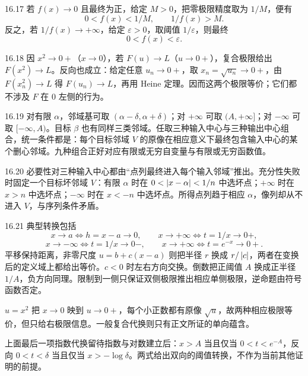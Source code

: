 \begin{solution}{16.17}
若 \(f(x)\to0\) 且最终为正，给定 \(M>0\)，把零极限精度取为 \(1/M\)，便有
\[
 0<f(x)<1/M,\qquad1/f(x)>M.
\]
反之，若 \(1/f(x)\to+\infty\)，给定 \(\varepsilon>0\)，取阈值 \(1/\varepsilon\)，则最终
\[
 0<f(x)<\varepsilon.
\]
\end{solution}

\begin{solution}{16.18}
因 \(x^2\to0+\)（\(x\to0\)），若 \(F(u)\to L\)（\(u\to0+\)），复合极限给出 \(F(x^2)\to L\)。反向也成立：给定任意 \(u_n\to0+\)，取 \(x_n=\sqrt{u_n}\to0+\)，由 \(F(x_n^2)\to L\) 得 \(F(u_n)\to L\)，再用 Heine 定理。因而这两个极限等价；它们都不涉及 \(F\) 在 \(0\) 左侧的行为。
\end{solution}

\begin{solution}{16.19}
对有限 \(\alpha\)，邻域基可取 \((\alpha-\delta,\alpha+\delta)\)；对 \(+\infty\) 可取 \((A,+\infty]\)；对 \(-\infty\) 可取 \([-\infty,A)\)。目标 \(\beta\) 也有同样三类邻域。任取三种输入中心与三种输出中心组合，统一条件都是：每个目标邻域 \(V\) 的原像在相应意义下最终包含输入中心的某个删心邻域。九种组合正好对应有限或无穷自变量与有限或无穷函数值。
\end{solution}

\begin{solution}{16.20}
必要性对三种输入中心都由“点列最终进入每个输入邻域”推出。充分性失败时固定一个目标坏邻域 \(V\)：有限 \(\alpha\) 时在 \(0<\left|x-\alpha\right|<1/n\) 中选坏点；\(+\infty\) 时在 \(x>n\) 中选坏点；\(-\infty\) 时在 \(x<-n\) 中选坏点。所得点列趋于相应 \(\alpha\)，像列却从不进入 \(V\)，与序列条件矛盾。
\end{solution}

\begin{solution}{16.21}
典型转换包括
\[
 x\to a\Longleftrightarrow h=x-a\to0,\qquad
 x\to+\infty\Longleftrightarrow t=1/x\to0+,
\]
\[
 x\to-\infty\Longleftrightarrow t=1/x\to0-,\qquad
 x\to+\infty\Longleftrightarrow t=e^{-x}\to0+.
\]
平移保持距离，非零尺度 \(u=b+c(x-a)\) 则把半径 \(r\) 换成 \(r/\left|c\right|\)，两者在变换后的定义域上都给出等价。\(c<0\) 时左右方向交换。倒数把正阈值 \(A\) 换成正半径 \(1/A\)，负方向同理。限制到一侧只保证双侧极限推出相应单侧极限，逆命题由符号函数否定。

\(u=x^2\) 把 \(x\to0\) 映到 \(u\to0+\)，每个小正数都有原像 \(\sqrt u\)，故两种相应极限等价，但只给右极限信息。一般复合代换则只有正文所证的单向蕴含。

上面最后一项指数代换留待指数与对数建立后：\(x>A\) 当且仅当 \(0<t<e^{-A}\)，反向 \(0<t<\delta\) 当且仅当 \(x>-\log\delta\)。两式给出双向的阈值转换，不作为当前其他证明的前提。
\end{solution}

